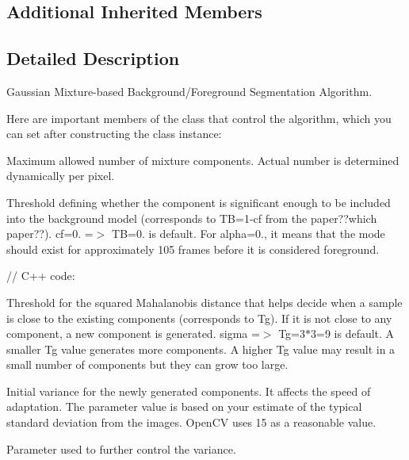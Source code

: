 \subsection*{Additional Inherited Members}


\subsection{Detailed Description}
Gaussian Mixture-\/based Background/\+Foreground Segmentation Algorithm.

Here are important members of the class that control the algorithm, which you can set after constructing the class instance\+:

Maximum allowed number of mixture components. Actual number is determined dynamically per pixel.

Threshold defining whether the component is significant enough to be included into the background model (corresponds to {\ttfamily TB=1-\/cf} from the paper??which paper??). {\ttfamily cf=0. =$>$ TB=0.} is default. For {\ttfamily alpha=0.}, it means that the mode should exist for approximately 105 frames before it is considered foreground. {\ttfamily }

{\ttfamily }

{\ttfamily }

{\ttfamily // C++ code\+:}

{\ttfamily }

{\ttfamily }

{\ttfamily Threshold for the squared Mahalanobis distance that helps decide when a sample is close to the existing components (corresponds to {\ttfamily Tg}). If it is not close to any component, a new component is generated. { sigma =$>$ Tg=3$\ast$3=9} is default. A smaller {\ttfamily Tg} value generates more components. A higher {\ttfamily Tg} value may result in a small number of components but they can grow too large.}

{\ttfamily }

{\ttfamily }

{\ttfamily Initial variance for the newly generated components. It affects the speed of adaptation. The parameter value is based on your estimate of the typical standard deviation from the images. Open\+CV uses 15 as a reasonable value.}

{\ttfamily }

{\ttfamily }

{\ttfamily Parameter used to further control the variance.}

